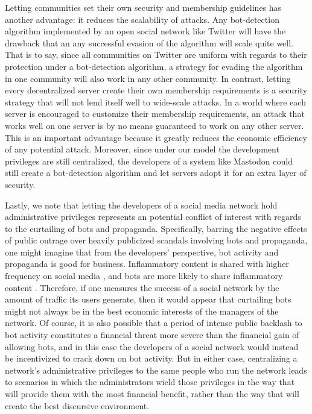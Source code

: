\documentclass[sigconf,authordraft]{acmart}
\begin{document}
Letting communities set their own security and membership guidelines has another advantage: it reduces the scalability of attacks. Any bot-detection algorithm implemented by an open social network like Twitter will have the drawback that an any successful evasion of the algorithm will scale quite well. That is to say, since all communities on Twitter are uniform with regards to their protection under a bot-detection algorithm, a strategy for evading the algorithm in one community will also work in any other community. In contrast, letting every decentralized server create their own membership requirements is a security strategy that will not lend itself well to wide-scale attacks. In a world where each server is encouraged to customize their membership requirements, an attack that works well on one server is by no means guaranteed to work on any other server. This is an important advantage because it greatly reduces the economic efficiency of any potential attack. Moreover, since under our model the development privileges are still centralized, the developers of a system like Mastodon could still create a bot-detection algorithm and let servers adopt it for an extra layer of security.

Lastly, we note that letting the developers of a social media network hold administrative privileges represents an potential conflict of interest with regards to the curtailing of bots and propaganda. Specifically, barring the negative effects of public outrage over heavily publicized scandals involving bots and propaganda, one might imagine that from the developers' perspective, bot activity and propaganda is good for business. Inflammatory content is shared with higher frequency on social media \cite{stieglitz2013emotions}, and bots are more likely to share inflammatory content \cite{stella2018bots}. Therefore, if one measures the success of a social network by the amount of traffic its users generate, then it would appear that curtailing bots might not always be in the best economic interests of the managers of the network. Of course, it is also possible that a period of intense public backlash to bot activity constitutes a financial threat more severe than the financial gain of allowing bots, and in this case the developers of a social network would instead be incentivized to crack down on bot activity. But in either case, centralizing a network's administrative privileges to the same people who run the network leads to scenarios in which the administrators wield those privileges in the way that will provide them with the most financial benefit, rather than the way that will create the best discursive environment.
\end{document}
